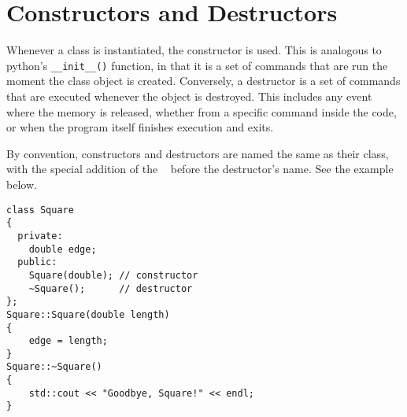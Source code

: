 \section{Constructors and Destructors}
Whenever a class is instantiated, the constructor is used.  This is analogous to python's \texttt{\_\_init\_\_()} function, in that it is a set of commands that are run the moment the class object is created.  Conversely, a destructor is a set of commands that are executed whenever the object is destroyed.  This includes any event where the memory is released, whether from a specific command inside the code, or when the program itself finishes execution and exits.

By convention, constructors and destructors are named the same as their class, with the special addition of the \texttt{~} before the destructor's name.  See the example below.

\begin{verbatim}
class Square
{
  private:
    double edge;
  public:
    Square(double); // constructor
    ~Square();      // destructor
};
Square::Square(double length)
{
    edge = length;
}
Square::~Square()
{
    std::cout << "Goodbye, Square!" << endl;
}
\end{verbatim}
